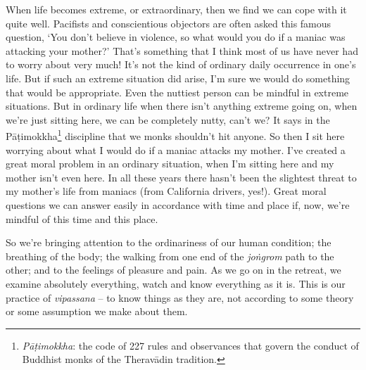 When life becomes extreme, or extraordinary, then we find we can cope with it quite well. Pacifists and conscientious objectors are often asked this famous question, `You don't believe in violence, so what would you do if a maniac was attacking your mother?' That's something that I think most of us have never had to worry about very much! It's not the kind of ordinary daily occurrence in one's life. But if such an extreme situation did arise, I'm sure we would do something that would be appropriate. Even the nuttiest person can be mindful in extreme situations. But in ordinary life when there isn't anything extreme going on, when we're just sitting here, we can be completely nutty, can't we? It says in the P\=a\d{t}imokkha\footnote{\textit{P\=a\d{t}imokkha}: the code of 227 rules and observances that govern the conduct of Buddhist monks of the Therav\=adin tradition.} discipline that we monks shouldn't hit anyone. So then I sit here worrying about what I would do if a maniac attacks my mother. I've created a great moral problem in an ordinary situation, when I'm sitting here and my mother isn't even here. In all these years there hasn't been the slightest threat to my mother's life from maniacs (from California drivers, yes!). Great moral questions we can answer easily in accordance with time and place if, now, we're mindful of this time and this place.

So we're bringing attention to the ordinariness of our human condition; the breathing of the body; the walking from one end of the \textit{jo\.ngrom} path to the other; and to the feelings of pleasure and pain. As we go on in the retreat, we examine absolutely everything, watch and know everything as it is. This is our practice of \textit{vipassana} -- to know things as they are, not according to some theory or some assumption we make about them.

